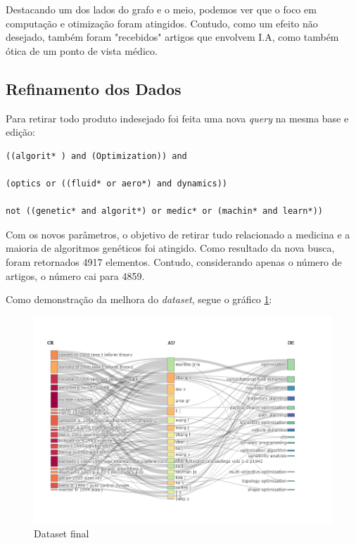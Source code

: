     Destacando um dos lados do grafo e o meio, podemos ver que o foco em computação e otimização foram atingidos. Contudo, como um efeito não desejado, também foram "recebidos" artigos que envolvem I.A, como também ótica de um ponto de vista médico.
    
\subsection{Refinamento dos Dados}
    Para retirar todo produto indesejado foi feita uma nova \emph{query} na mesma base e edição:
    
\begin{lstlisting}[basicstyle = \normalsize]
((algorit* ) and (Optimization)) and 

(optics or ((fluid* or aero*) and dynamics))

not ((genetic* and algorit*) or medic* or (machin* and learn*))
\end{lstlisting}

    Com os novos parâmetros, o objetivo de retirar tudo relacionado a medicina e a maioria de algoritmos genéticos foi atingido. Como resultado da nova busca, foram retornados 4917 elementos. Contudo, considerando apenas o número de artigos, o número cai para 4859.
    
    Como demonstração da melhora do \emph{dataset}, segue o gráfico \ref{fig:KvotheKS:Final_Data_Set}:
    
    \begin{figure}[H]
    \centering
    \includegraphics[width=1.3\textwidth]{experiments/KvotheKS/PesqBibliogr/AlgoritmosSimulacaoOptica-Dinamica/WoS-20220202/Dataset/AU_CR_DE.png}
    \caption{Dataset final}
    \label{fig:KvotheKS:Final_Data_Set}
\end{figure}

